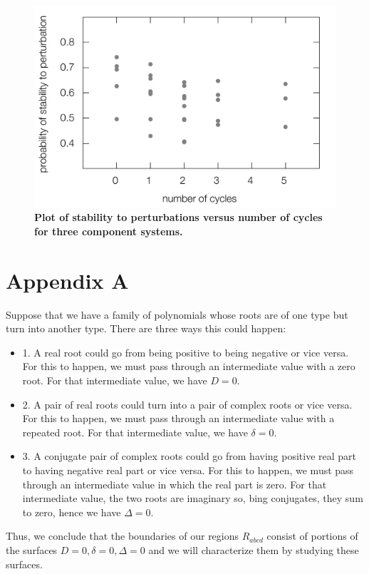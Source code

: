 \documentclass{amsart}
\theoremstyle{definition}
\theoremstyle{remark}
\numberwithin{equation}{section}
\begin{document}
\begin{figure}[!ht]
\centering
\noindent\includegraphics[width=0.8\columnwidth]{fig/cycle3x3.pdf}
\caption{{\bf Plot of stability to perturbations versus number of cycles for three component systems.} }
\label{fig:cycle3x3}
\end{figure}

\newpage




\newpage



\newpage

% 

\section{Appendix A}\label{sec:appA}
Suppose that we have a family
of polynomials whose roots are of one type but turn into another type.
There are three ways this could happen:
\begin{itemize}
\item{1.} A real root could go from being positive to being negative
  or vice versa.  For this to happen, we must pass through an
  intermediate value with a zero root.  For that intermediate value,
  we have $D = 0$.
\item{2.} A pair of real roots could turn into a pair of complex roots
  or vice versa.  For this to happen, we must pass through an
  intermediate value with a repeated root.  For that intermediate
  value, we have $\delta = 0$.
\item{3.} A conjugate pair of complex roots could go from having
  positive real part to having negative real part or vice versa.  For
  this to happen, we must pass through an intermediate value in which
  the real part is zero.  For that intermediate value, the two roots
  are imaginary so, bing conjugates, they sum to zero, hence we have
  $\Delta = 0$.
\end{itemize}
\noindent  Thus, we conclude that the boundaries of our regions
$R_{abcd}$ consist of portions of the surfaces $D=0, \delta=0,
\Delta=0$ and we will characterize them by studying these surfaces.
\end{document}
